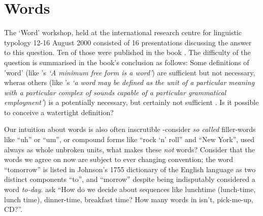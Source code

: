 \chapter{Words}\label{chap:words}
\noindent
The `Word' workshop, held at the international research centre for linguistic typology 12-16 August 2000 consisted of 16 presentations discussing the answer to this question. Ten of those were published in the book . The difficulty of the question is summarised in the book's conclusion as follows:
\noindent
Some definitions of 'word' (like \citeauthor{bloomfield-1926-a-set-of}'s \parencite*{bloomfield-1926-a-set-of} \emph{`A minimum free form is a word'}) are sufficient but not necessary, wheras others (like \citeauthor{lyons-1968-introduction}'s \parencite*{lyons-1968-introduction} \emph{`a word may be defined as the unit of a particular meaning with a particular complex of sounds capable of a particular grammatical employment'}) is a potentially necessary, but certainly not sufficient \parencite{dixon02-word}. Is it possible to conceive a watertight definition?

Our intuition about words is also often inscrutible -consider \emph{so called} filler-words like ``uh'' or ``um'', or compound forms like ``rock `n' roll'' and ``New York'', used always as whole unbroken units, what makes these \emph{not} words? Consider that the words we agree on now are subject to ever changing convention; the word ``tomorrow'' is listed in Johnson's 1755 dictionary of the English language as two distinct components ``to'', and ``morrow'' despite being indisputably considered a word \emph{to-day}. \textcite{halliday-2004-lexicology} ask ``How do we decide about sequences like lunchtime (lunch-time, lunch time), dinner-time, breakfast time? How many words in isn't, pick-me-up, CD?''.

